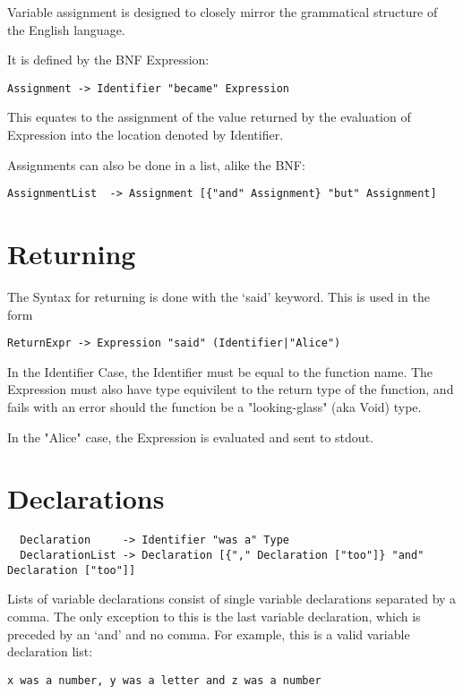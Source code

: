 \documentclass[a4wide, 11pt]{article}
\begin{document}
Variable assignment is designed to closely mirror the grammatical structure of the English language.

It is defined by the BNF Expression:

\begin{verbatim}
Assignment -> Identifier "became" Expression
\end{verbatim}

This equates to the assignment of the value returned by the evaluation of Expression into the location denoted by Identifier.

Assignments can also be done in a list, alike the BNF:
\begin{verbatim}
AssignmentList  -> Assignment [{"and" Assignment} "but" Assignment]
\end{verbatim}

\section {Returning}

The Syntax for returning is done with the `said' keyword. This is used in the form
\begin{verbatim}
ReturnExpr -> Expression "said" (Identifier|"Alice")
\end{verbatim}
In the Identifier Case, the Identifier must be equal to the function name. The Expression must also have type equivilent to the return type of the function, and fails with an error should the function be a "looking-glass" (aka Void) type.

In the "Alice" case, the Expression is evaluated and sent to stdout.

\section{Declarations}

\begin{verbatim}
  Declaration     -> Identifier "was a" Type
  DeclarationList -> Declaration [{"," Declaration ["too"]} "and" Declaration ["too"]]
\end{verbatim}

Lists of variable declarations consist of single variable declarations separated by a comma. The only exception to this is the last variable declaration, which is preceded by an `and' and no comma. For example, this is a valid variable declaration list:

\begin{verbatim}
x was a number, y was a letter and z was a number
\end{verbatim}
\end{document}
